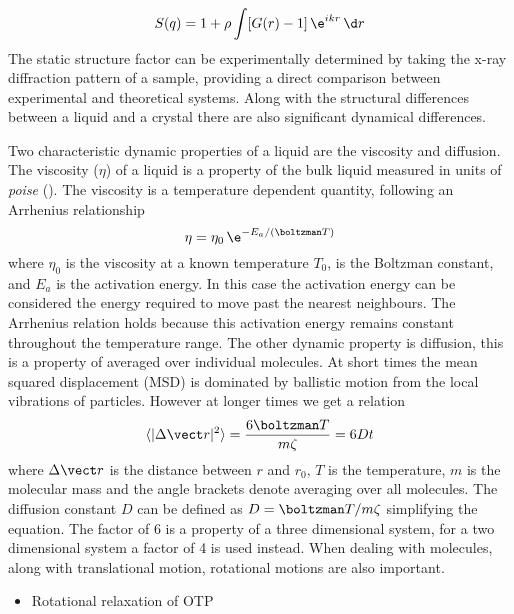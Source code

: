 \begin{equation}
    S(q) = 1 + \rho \int [G(r)-1]\,\e^{ikr}\, \d r
\end{equation}
The static structure factor can be experimentally determined by taking the x-ray diffraction pattern of a sample, providing a direct comparison between experimental and theoretical systems. Along with the structural differences between a liquid and a crystal there are also significant dynamical differences.

\begin{figure}
    \caption{}
    \label{fig:radial distribution}
\end{figure}

Two characteristic dynamic properties of a liquid are the viscosity and diffusion. The viscosity ($\eta$) of a liquid is a property of the bulk liquid measured in units of \emph{poise} (\si{\poise}). The viscosity is a temperature dependent quantity, following an Arrhenius relationship
\begin{equation}
    \eta = \eta_0\, \e^{-E_a/(\boltzman T)}
\end{equation}
where $\eta_0$ is the viscosity at a known temperature $T_0$, \boltzman is the Boltzman constant, and $E_a$ is the activation energy. In this case the activation energy can be considered the energy required to move past the nearest neighbours. The Arrhenius relation holds because this activation energy remains constant throughout the temperature range. The other dynamic property is diffusion, this is a property of averaged over individual molecules. At short times the mean squared displacement (MSD) is dominated by ballistic motion from the local vibrations of particles. However at longer times we get a relation
\begin{equation}
    \langle |\Delta \vect r|^2 \rangle = \frac{6\boltzman T}{m\zeta} = 6Dt
\end{equation}
where $\Delta \vect r$ is the distance between $r$ and $r_0$, $T$ is the temperature, $m$ is the molecular mass and the angle brackets denote averaging over all molecules. The diffusion constant $D$ can be defined as $D = \boltzman T/m\zeta$ simplifying the equation. The factor of 6 is a property of a three dimensional system, for a two dimensional system a factor of 4 is used instead. When dealing with molecules, along with translational motion, rotational motions are also important.


\begin{itemize}
    \item Rotational relaxation of OTP~\cite{eastwood:13}
\end{itemize}


